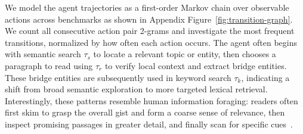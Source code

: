 \documentclass[11pt]{article}
\begin{document}
We model the agent trajectories as a first-order Markov chain over observable actions across benchmarks as shown in Appendix Figure~\ref{fig:transition-graph}. We count all consecutive action pair 2-grams and investigate the most frequent transitions, normalized by how often each action occurs. 
%
The agent often begins with semantic search $\tau_s$ to locate a relevant topic or entity, then chooses a paragraph to read using $\tau_r$ to verify local context and extract bridge entities. These bridge entities are subsequently used in keyword search $\tau_k$, indicating a shift from broad semantic exploration to more targeted lexical retrieval. Interestingly, these patterns resemble human information foraging: readers often first skim to grasp the overall gist and form a coarse sense of relevance, then inspect promising passages in greater detail, and finally scan for specific cues~\cite{grellet1981developing}. 

\end{document}
